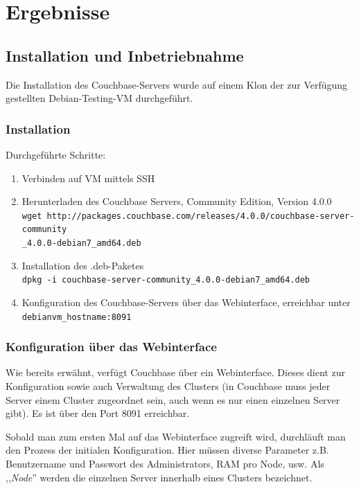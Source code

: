 
\section{Ergebnisse}

\subsection{Installation und Inbetriebnahme}
Die Installation des Couchbase-Servers wurde auf einem Klon der zur Verfügung gestellten Debian-Testing-VM durchgeführt.

\subsubsection{Installation}
Durchgeführte Schritte:
\begin{enumerate}
	\item Verbinden auf VM mittels SSH
	\item Herunterladen des Couchbase Servers, Community Edition, Version 4.0.0 \cite{couchbase-download}\\
	\texttt{wget http://packages.couchbase.com/releases/4.0.0/couchbase-server-community\\\_4.0.0-debian7\_amd64.deb}
	\item Installation des .deb-Paketes\\
	\texttt{dpkg -i couchbase-server-community\_4.0.0-debian7\_amd64.deb}
	\item Konfiguration des Couchbase-Servers über das Webinterface, erreichbar unter\\
	\texttt{debianvm\_hostname:8091}
\end{enumerate}

\subsubsection{Konfiguration über das Webinterface}
Wie bereits erwähnt, verfügt Couchbase über ein Webinterface. Dieses dient zur Konfiguration sowie auch Verwaltung des Clusters (in Couchbase muss jeder Server einem Cluster zugeordnet sein, auch wenn es nur einen einzelnen Server gibt). Es ist über den Port 8091 erreichbar.

Sobald man zum ersten Mal auf das Webinterface zugreift wird, durchläuft man den Prozess der initialen Konfiguration. Hier müssen diverse Parameter z.B. Benutzername und Passwort des Administrators, RAM pro Node, usw.
Als ,,\textit{Node}'' werden die einzelnen Server innerhalb eines Clusters bezeichnet.

